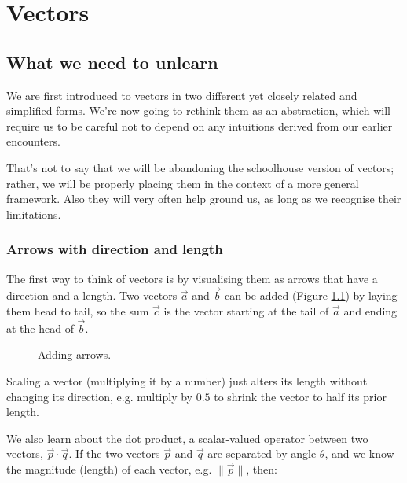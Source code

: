 \chapter{Vectors} \label{ch:vectors}

\section{What we need to unlearn}

We are first introduced to vectors in two different yet closely related and simplified forms. We're now going to rethink them as an abstraction, which will require us to be careful not to depend on any intuitions derived from our earlier encounters.

That's not to say that we will be abandoning the schoolhouse version of vectors; rather, we will be properly placing them in the context of a more general framework. Also they will very often help ground us, as long as we recognise their limitations.

\subsection{Arrows with direction and length}

The first way to think of vectors is by visualising them as arrows that have a direction and a length. Two vectors $\vec{a}$ and $\vec{b}$ can be added (Figure \ref{fig:vector-addition}) by laying them head to tail, so the sum $\vec{c}$ is the vector starting at the tail of $\vec{a}$ and ending at the head of $\vec{b}$.

\begin{figure}[h]
    \centering
    \caption{Adding arrows.} \label{fig:vector-addition}
\end{figure}

Scaling a vector (multiplying it by a number) just alters its length without changing its direction, e.g. multiply by $0.5$ to shrink the vector to half its prior length.

We also learn about the dot product, a scalar-valued operator between two vectors, $\vec{p}\cdot\vec{q}$. If the two vectors $\vec{p}$ and $\vec{q}$ are separated by angle $\theta$, and we know the magnitude (length) of each vector, e.g. $\|\vec{p}\|$, then:

